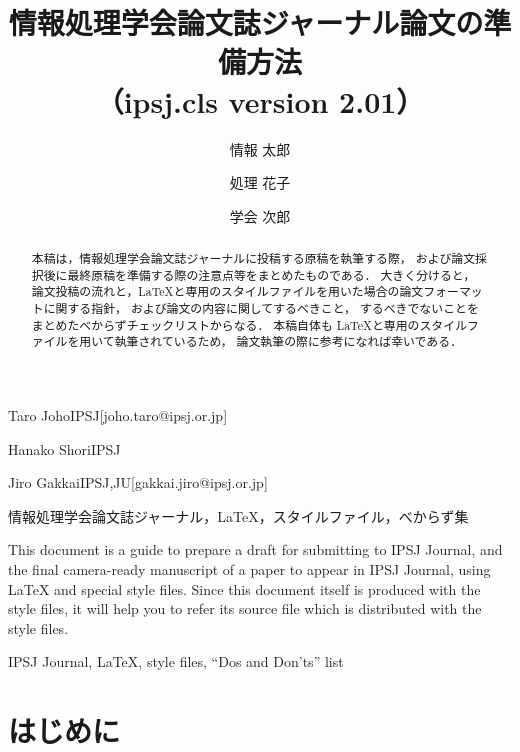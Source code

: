 \documentclass[submit]{ipsj}
\begin{document}
\title{情報処理学会論文誌ジャーナル論文の準備方法\\
	（ipsj.cls version 2.01）}




\author{情報 太郎}{Taro Joho}{IPSJ}[joho.taro@ipsj.or.jp]
\author{処理 花子}{Hanako Shori}{IPSJ}
\author{学会 次郎}{Jiro Gakkai}{IPSJ,JU}[gakkai.jiro@ipsj.or.jp]

\begin{abstract}
本稿は，情報処理学会論文誌ジャーナルに投稿する原稿を執筆する際，
および論文採択後に最終原稿を準備する際の注意点等をまとめたものである．
大きく分けると，
論文投稿の流れと，\LaTeX と専用のスタイルファイルを用いた場合の論文フォーマットに関する指針，
および論文の内容に関してするべきこと，
するべきでないことをまとめたべからずチェックリストからなる．
本稿自体も \LaTeX と専用のスタイルファイルを用いて執筆されているため，
論文執筆の際に参考になれば幸いである．
\end{abstract}

\begin{jkeyword}
	情報処理学会論文誌ジャーナル，\LaTeX，スタイルファイル，べからず集
\end{jkeyword}

\begin{eabstract}
	This document is a guide to prepare a draft for submitting to IPSJ
	Journal, and the final camera-ready manuscript of a paper to appear in
	IPSJ Journal, using {\LaTeX} and special style files. Since this
	document itself is produced with the style files, it will help you to
	refer its source file which is distributed with the style files.
\end{eabstract}

\begin{ekeyword}
	IPSJ Journal, \LaTeX, style files, ``Dos and Don'ts'' list
\end{ekeyword}

\maketitle

\section{はじめに}
\end{document}
